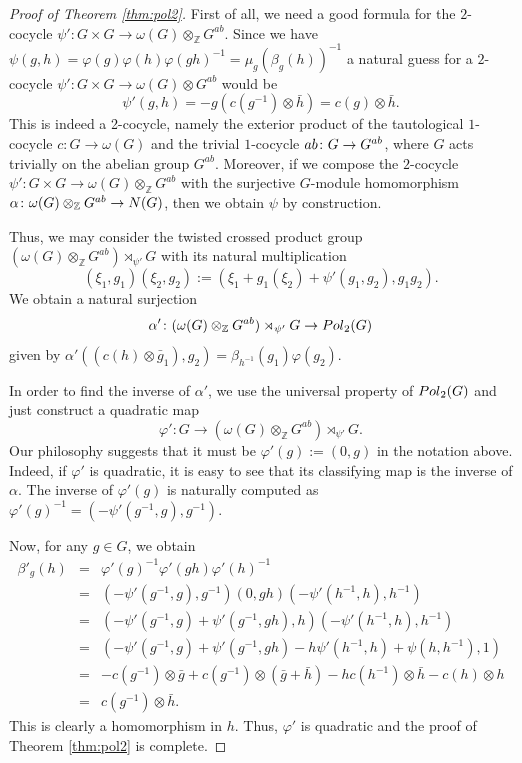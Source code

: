 \documentclass[a4paper,11pt]{amsproc}
\theoremstyle{plain}
\theoremstyle{definition}
\begin{document}
\begin{proof}[Proof of Theorem \ref{thm:pol2}]
First of all, we need a good formula for the $2$-cocycle $\psi' \colon G \times G \to \omega(G) \otimes_{\mathbb Z }G^{ab}.$
Since we have
$\psi(g,h)=\varphi(g)\varphi(h)\varphi(gh)^{-1}
= \mu_g(\beta_g(h))^{-1}$
a natural guess for a $2$-cocycle $\psi' \colon G \times G \to \omega(G) \otimes G^{ab}$ would be
$$\psi'(g,h)=- g (c(g^{-1}) \otimes \bar h) =  c(g) \otimes \bar h.$$ This is indeed a 2-cocycle, namely the exterior product of the tautological $1$-cocycle $c \colon G \to \omega(G)$ and the trivial $1$-cocycle ${\rm ab} \colon G \to G^{ab}$, where $G$ acts trivially on the abelian group $G^{ab}.$
Moreover, if we compose the $2$-cocycle $\psi' \colon G \times G \to \omega(G) \otimes_{\mathbb Z }G^{ab}$ with the surjective $G$-module homomorphism $\alpha \colon  \omega(G) \otimes_{\mathbb Z }G^{ab}  \to {\rm N}(G)$, then we obtain $\psi$ by construction.

Thus, we may consider the twisted crossed product group
$(\omega(G) \otimes_{\mathbb Z} G^{ab}) \rtimes_{\psi'} G$ with its natural multiplication
$$(\xi_1,g_1)(\xi_2,g_2) := (\xi_1 + g_1(\xi_2) + \psi'(g_1,g_2),g_1g_2).$$
We obtain a natural surjection $$\alpha' \colon (\omega(G) \otimes_{\mathbb Z} G^{ab}) \rtimes_{\psi'} G \to {\rm Pol}_2(G)$$ given by
$\alpha'((c(h) \otimes \bar g_1),g_2) = \beta_{h^{-1}}(g_1) \varphi(g_2).$

In order to find the inverse of $\alpha'$, we use the universal property of ${\rm Pol}_2(G)$ and just construct a quadratic map
$$\varphi' \colon G \to (\omega(G) \otimes_{\mathbb Z} G^{ab}) \rtimes_{\psi'} G.$$ Our philosophy suggests that it must be 
$\varphi'(g):= (0,g)$ in the notation above. Indeed, if $\varphi'$ is quadratic, it is easy to see that its classifying map is the inverse of $\alpha$. The inverse of $\varphi'(g)$ is naturally computed as $\varphi'(g)^{-1} = (-\psi'(g^{-1},g),g^{-1}).$

Now, for any $g \in G$, we obtain
\begin{eqnarray*}
\beta'_g(h)&=& \varphi'(g)^{-1} \varphi'(gh) \varphi'(h)^{-1}\\
&=& (-\psi'(g^{-1},g),g^{-1})(0,gh)(-\psi'(h^{-1},h),h^{-1}) \\
&=& (-\psi'(g^{-1},g) + \psi'(g^{-1},gh),h)(-\psi'(h^{-1},h),h^{-1})\\
&=& (-\psi'(g^{-1},g) + \psi'(g^{-1},gh) - h \psi'(h^{-1},h) + \psi(h,h^{-1}),1) \\
&=& -c(g^{-1}) \otimes \bar g + c(g^{-1}) \otimes (\bar g +\bar h) - hc(h^{-1}) \otimes \bar h - c(h) \otimes h\\
&=& c(g^{-1}) \otimes \bar h.
\end{eqnarray*}
This is clearly a homomorphism in $h$. Thus, $\varphi'$ is quadratic and the proof of Theorem \ref{thm:pol2} is complete.
\end{proof}
\end{document}
